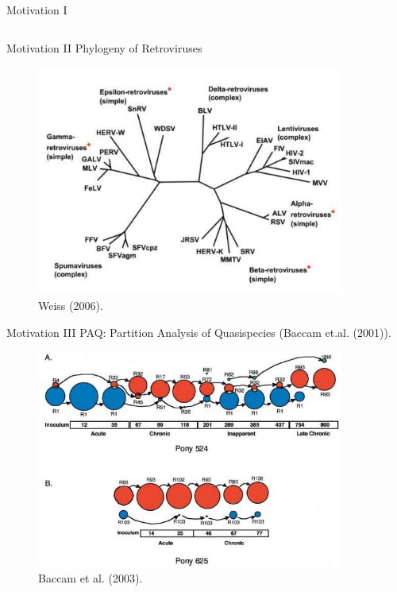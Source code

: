 \documentclass{beamer}
\begin{document}
\begin{frame}{Motivation I}
\begin{itemize}
\begin{columns}
\end{columns}

\end{itemize}
\end{frame}


\begin{frame}{Motivation II}
Phylogeny of Retroviruses
\vspace{-0.2cm}
\begin{figure}
\includegraphics[width=0.9\textwidth]{./graph/retroviruses}
\\
{\tiny Weiss (2006).}
\end{figure}

\end{frame}


\begin{frame}{Motivation III}
PAQ: Partition Analysis of Quasispecies (Baccam et.al. (2001)).
\vspace{-0.2cm}
\begin{figure}
\includegraphics[width=0.9\textwidth]{./graph/paq}
\\
{\tiny Baccam et al. (2003).}
\end{figure}

\end{frame}
\end{document}
